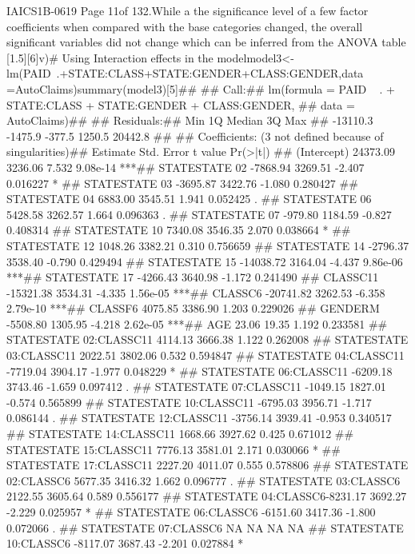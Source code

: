 IAICS1B-0619
Page 11of 132.While a the significance level of a few factor coefficients when compared with the base categories changed, the overall significant variables did not change which can be inferred from the ANOVA table [1.5][6]v)# Using Interaction effects in the modelmodel3<-lm(PAID~.+STATE:CLASS+STATE:GENDER+CLASS:GENDER,data =AutoClaims)summary(model3)[5]## ## Call:## lm(formula = PAID ~ . + STATE:CLASS + STATE:GENDER + CLASS:GENDER, ##     data = AutoClaims)## ## Residuals:##      Min       1Q   Median       3Q      Max ## -13110.3  -1475.9   -377.5   1250.5  20442.8 ## ## Coefficients: (3 not defined because of singularities)##                         Estimate Std. Error t value Pr(>|t|)    ## (Intercept)             24373.09    3236.06   7.532 9.08e-14 ***## STATESTATE 02           -7868.94    3269.51  -2.407 0.016227 *  ## STATESTATE 03           -3695.87    3422.76  -1.080 0.280427    ## STATESTATE 04            6883.00    3545.51   1.941 0.052425 .  ## STATESTATE 06            5428.58    3262.57   1.664 0.096363 .  ## STATESTATE 07            -979.80    1184.59  -0.827 0.408314    
## STATESTATE 10            7340.08    3546.35   2.070 0.038664 *  ## STATESTATE 12            1048.26    3382.21   0.310 0.756659    ## STATESTATE 14           -2796.37    3538.40  -0.790 0.429494    ## STATESTATE 15          -14038.72 3164.04  -4.437 9.86e-06 ***## STATESTATE 17           -4266.43    3640.98  -1.172 0.241490    ## CLASSC11               -15321.38    3534.31  -4.335 1.56e-05 ***## CLASSC6                -20741.82    3262.53  -6.358 2.79e-10 ***## CLASSF6          4075.85    3386.90   1.203 0.229026    ## GENDERM                 -5508.80    1305.95  -4.218 2.62e-05 ***## AGE                        23.06      19.35   1.192 0.233581    ## STATESTATE 02:CLASSC11   4114.13    3666.38   1.122 0.262008    ## STATESTATE 03:CLASSC11   2022.51    3802.06   0.532 0.594847    ## STATESTATE 04:CLASSC11  -7719.04    3904.17  -1.977 0.048229 *  ## STATESTATE 06:CLASSC11  -6209.18    3743.46  -1.659 0.097412 .  ## STATESTATE 07:CLASSC11  -1049.15    1827.01  -0.574 0.565899    
## STATESTATE 10:CLASSC11  -6795.03    3956.71  -1.717 0.086144 .  ## STATESTATE 12:CLASSC11  -3756.14    3939.41  -0.953 0.340517    ## STATESTATE 14:CLASSC11   1668.66    3927.62   0.425 0.671012    ## STATESTATE 15:CLASSC11   7776.13    3581.01   2.171 0.030066 *  ## STATESTATE 17:CLASSC11   2227.20    4011.07   0.555 0.578806    ## STATESTATE 02:CLASSC6    5677.35    3416.32   1.662 0.096777 .  ## STATESTATE 03:CLASSC6    2122.55    3605.64   0.589 0.556177    ## STATESTATE 04:CLASSC6-8231.17    3692.27  -2.229 0.025957 *  ## STATESTATE 06:CLASSC6   -6151.60    3417.36  -1.800 0.072066 .  ## STATESTATE 07:CLASSC6         NA         NA      NA       NA    ## STATESTATE 10:CLASSC6   -8117.07    3687.43  -2.201 0.027884 *  
